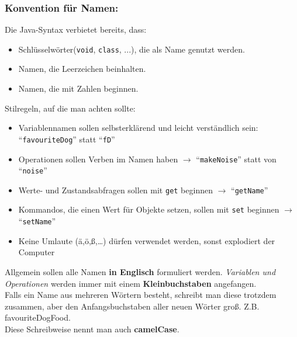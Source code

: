 \vspace{5mm}

\subsubsection*{Konvention für Namen:}

\begin{Infobox}
	Die Java-Syntax verbietet bereits, dass:

	\begin{itemize}
		\item Schlüsselwörter(\lstinline{void}, \lstinline{class}, ...), die als Name genutzt werden.
		\item Namen, die Leerzeichen beinhalten.
		\item Namen, die mit Zahlen beginnen.
	\end{itemize}
\end{Infobox}

\vspace{5mm}

\begin{Infobox}
	Stilregeln, auf die man achten sollte:
	\begin{itemize}
		\item Variablennamen sollen selbsterklärend und leicht verständlich sein: \enquote{\lstinline{favouriteDog}} statt \enquote{\lstinline{fD}}
		\item Operationen sollen Verben im Namen haben $\rightarrow$ \enquote{\lstinline{makeNoise}} statt von \enquote{\lstinline{noise}}
		\item Werte- und Zustandsabfragen sollen mit \lstinline{get} beginnen $\rightarrow$ \enquote{\lstinline{getName}}
		\item Kommandos, die einen Wert für Objekte setzen, sollen mit \lstinline{set} beginnen $\rightarrow$ \enquote{\lstinline{setName}}
		\item Keine Umlaute (ä,ö,ß,\dots) dürfen verwendet werden, sonst explodiert der Computer

	\end{itemize}
\end{Infobox}

\vspace{5mm}

\noindent
Allgemein sollen alle Namen \textbf{in Englisch} formuliert werden.
\textit{Variablen und Operationen} werden immer mit einem \textbf{Kleinbuchstaben} angefangen.\\

\noindent
Falls ein Name aus mehreren Wörtern besteht, schreibt man diese trotzdem zusammen, aber den Anfangsbuchstaben aller neuen Wörter groß. Z.B. favouriteDogFood.\\
Diese Schreibweise nennt man auch \textbf{camelCase}.\\

